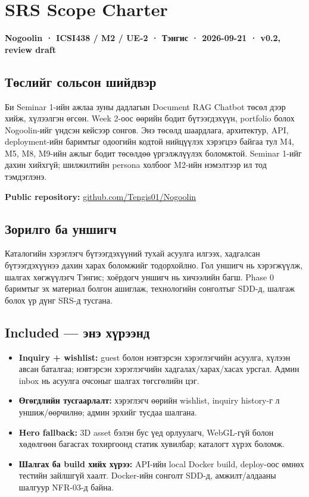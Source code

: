 \documentclass[
  11pt,
  a4paper,
]{article}
\author{}
\date{}
\providecommand{\tightlist}{%
  \setlength{\itemsep}{0pt}\setlength{\parskip}{0pt}}
\begin{document}
\section{SRS Scope Charter}\label{doc1-srs-scope-charter}

\textbf{Nogoolin · ICSI438 / M2 / UE-2 · Тэнгис · 2026-09-21 · v0.2,
review draft}

\subsection{Төслийг сольсон
шийдвэр}\label{doc1-ux442ux4e9ux441ux43bux438ux439ux433-ux441ux43eux43bux44cux441ux43eux43d-ux448ux438ux439ux434ux432ux44dux440}

Би Seminar 1-ийн ажлаа зуны дадлагын Document RAG Chatbot төсөл дээр
хийж, хүлээлгэн өгсөн. Week 2-оос өөрийн бодит бүтээгдэхүүн, portfolio
болох Nogoolin-ийг үндсэн кейсээр сонгов. Энэ төсөлд шаардлага,
архитектур, API, deployment-ийн баримтыг одоогийн кодтой нийцүүлэх
хэрэгцээ байгаа тул M4, M5, M8, M9-ийн ажлыг бодит төсөлдөө үргэлжлүүлэх
боломжтой. Seminar 1-ийг дахин хийхгүй; шилжилтийн persona холбоог
M2-ийн нэмэлтээр ил тод тэмдэглэнэ.

\textbf{Public repository:}
\href{https://github.com/Tengis01/Nogoolin}{github.com/Tengis01/Nogoolin}

\subsection{Зорилго ба
уншигч}\label{doc1-ux437ux43eux440ux438ux43bux433ux43e-ux431ux430-ux443ux43dux448ux438ux433ux447}

Каталогийн хэрэглэгч бүтээгдэхүүний тухай асуулга илгээх, хадгалсан
бүтээгдэхүүнээ дахин харах боломжийг тодорхойлно. Гол уншигч нь
хэрэгжүүлж, шалгах хөгжүүлэгч Тэнгис; хоёрдогч уншигч нь хичээлийн багш.
Phase 0 баримтыг эх материал болгон ашиглаж, технологийн сонголтыг
SDD-д, шалгаж болох үр дүнг SRS-д тусгана.

\subsection{Included --- энэ
хүрээнд}\label{doc1-included-ux44dux43dux44d-ux445ux4afux440ux44dux44dux43dux434}

\begin{itemize}
\tightlist
\item
  \textbf{Inquiry + wishlist:} guest болон нэвтэрсэн хэрэглэгчийн
  асуулга, хүлээн авсан баталгаа; нэвтэрсэн хэрэглэгчийн
  хадгалах/харах/хасах урсгал. Админ inbox нь асуулга очсоныг шалгах
  төгсгөлийн цэг.
\item
  \textbf{Өгөгдлийн тусгаарлалт:} хэрэглэгч өөрийн wishlist, inquiry
  history-г л уншиж/өөрчилнө; админ эрхийг тусдаа шалгана.
\item
  \textbf{Hero fallback:} 3D asset бэлэн бус үед орлуулагч, WebGL-гүй
  болон хөдөлгөөн багасгах тохиргоонд статик хувилбар; каталогт хүрэх
  боломж.
\item
  \textbf{Шалгах ба build хийх хүрээ:} API-ийн local Docker build,
  deploy-оос өмнөх тестийн зайлшгүй хаалт. Docker-ийн сонголт SDD-д,
  амжилт/алдааны шалгуур NFR-03-д байна.
\end{itemize}
\end{document}
